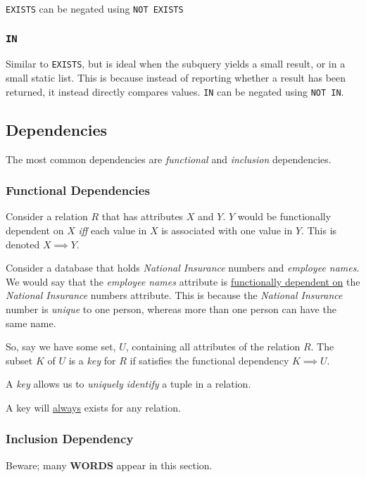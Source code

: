 \documentclass{article}
\begin{document}
\texttt{EXISTS} can be negated using \texttt{NOT EXISTS}

\subsubsection{\texttt{IN}}

Similar to \texttt{EXISTS}, but is ideal when the subquery yields a small result, or in a small static list. This is because instead of reporting whether a result has been returned, it instead directly compares values.
\texttt{IN} can be negated using \texttt{NOT IN}.

\subsection{Dependencies}

The most common dependencies are \textit{functional} and \textit{inclusion} dependencies.

\subsubsection{Functional Dependencies}

Consider a relation $R$ that has attributes $X$ and $Y$. $Y$ would be functionally dependent on $X$ \textit{iff} each value in $X$ is associated with one value in $Y$. This is denoted $X \implies Y$.

Consider a database that holds \textit{National Insurance} numbers and \textit{employee names}. We would say that the \textit{employee names} attribute is \underline{functionally dependent on} the \textit{National Insurance} numbers attribute. This is because the \textit{National Insurance} number is \textit{unique} to one person, whereas more than one person can have the same name.

So, say we have some set, $U$, containing all attributes of the relation $R$. The subset $K$ of $U$ is a \textit{key} for $R$ if satisfies the functional dependency $K \implies U$.

A \textit{key} allows us to \textit{uniquely identify} a tuple in a relation.

A key will \underline{always} exists for any relation.

\subsubsection{Inclusion Dependency}

Beware; many \textbf{WORDS} appear in this section.
\end{document}
